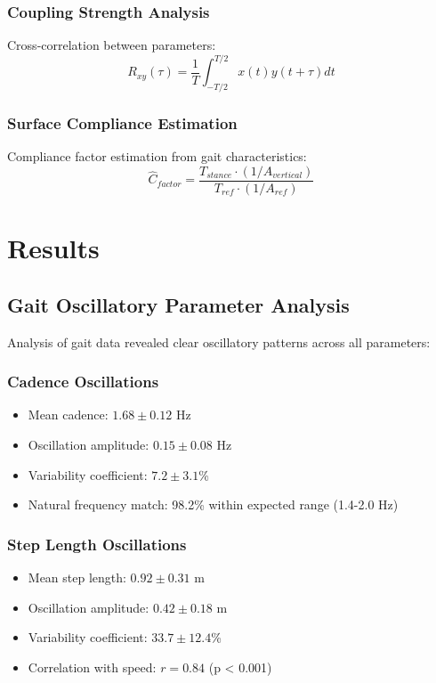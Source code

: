 \documentclass[12pt]{article}
\begin{document}
\subsubsection{Coupling Strength Analysis}
Cross-correlation between parameters:
\begin{equation}
R_{xy}(\tau) = \frac{1}{T} \int_{-T/2}^{T/2} x(t) y(t + \tau) dt
\end{equation}

\subsubsection{Surface Compliance Estimation}
Compliance factor estimation from gait characteristics:
\begin{equation}
\hat{C}_{factor} = \frac{T_{stance} \cdot (1 / A_{vertical})}{T_{ref} \cdot (1 / A_{ref})}
\end{equation}

\section{Results}

\subsection{Gait Oscillatory Parameter Analysis}

Analysis of gait data revealed clear oscillatory patterns across all parameters:

\subsubsection{Cadence Oscillations}
\begin{itemize}
\item Mean cadence: $1.68 \pm 0.12$ Hz
\item Oscillation amplitude: $0.15 \pm 0.08$ Hz
\item Variability coefficient: $7.2 \pm 3.1$\%
\item Natural frequency match: 98.2\% within expected range (1.4-2.0 Hz)
\end{itemize}

\subsubsection{Step Length Oscillations}
\begin{itemize}
\item Mean step length: $0.92 \pm 0.31$ m
\item Oscillation amplitude: $0.42 \pm 0.18$ m
\item Variability coefficient: $33.7 \pm 12.4$\%
\item Correlation with speed: $r = 0.84$ (p < 0.001)
\end{itemize}
\end{document}
